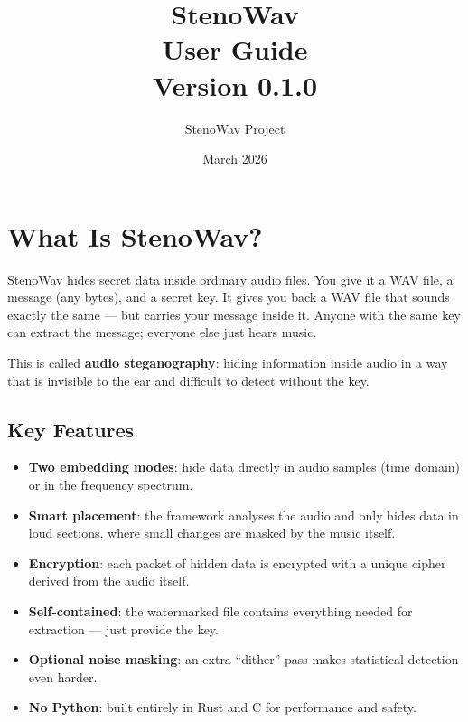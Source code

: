 \documentclass[11pt,a4paper]{article}
\title{
    \textbf{StenoWav} \\[0.5em]
    \Large User Guide \\[0.3em]
    \normalsize Version 0.1.0
}
\author{StenoWav Project}
\date{March 2026}
\begin{document}
\maketitle
\tableofcontents
\newpage

\section{What Is StenoWav?}

StenoWav hides secret data inside ordinary audio files.  You give it a
WAV file, a message (any bytes), and a secret key.  It gives you back a
WAV file that sounds exactly the same --- but carries your message inside
it.  Anyone with the same key can extract the message; everyone else
just hears music.

This is called \textbf{audio steganography}: hiding information inside
audio in a way that is invisible to the ear and difficult to detect
without the key.

\subsection{Key Features}

\begin{itemize}
    \item \textbf{Two embedding modes}: hide data directly in audio
          samples (time domain) or in the frequency spectrum.
    \item \textbf{Smart placement}: the framework analyses the audio
          and only hides data in loud sections, where small changes
          are masked by the music itself.
    \item \textbf{Encryption}: each packet of hidden data is encrypted
          with a unique cipher derived from the audio itself.
    \item \textbf{Self-contained}: the watermarked file contains
          everything needed for extraction --- just provide the key.
    \item \textbf{Optional noise masking}: an extra ``dither'' pass
          makes statistical detection even harder.
    \item \textbf{No Python}: built entirely in Rust and C for
          performance and safety.
\end{itemize}


\end{document}

